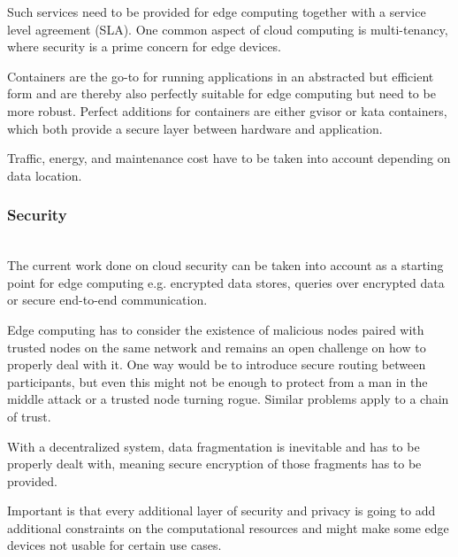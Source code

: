 Such services need to be provided for edge computing together with a service level agreement (SLA).
One common aspect of cloud computing is multi-tenancy, where security is a prime concern for edge devices.

Containers are the go-to for running applications in an abstracted but efficient form and are thereby also perfectly suitable for edge computing but need to be more robust. Perfect additions for containers are either gvisor or kata containers, which both provide a secure layer between hardware and application.

Traffic, energy, and maintenance cost have to be taken into account depending on data location.

\subsubsection{Security}\hspace*{\fill} \\
The current work done on cloud security can be taken into account as a starting point for edge computing e.g. encrypted data stores, queries over encrypted data or secure end-to-end communication.

Edge computing has to consider the existence of malicious nodes paired with trusted nodes on the same network and remains an open challenge on how to properly deal with it.
One way would be to introduce secure routing between participants, but even this might not be enough to protect from a man in the middle attack or a trusted node turning rogue. Similar problems apply to a chain of trust.

With a decentralized system, data fragmentation is inevitable and has to be properly dealt with, meaning secure encryption of those fragments has to be provided.

Important is that every additional layer of security and privacy is going to add additional constraints on the computational resources and might make some edge devices not usable for certain use cases.

\\

\\
\\

\\

